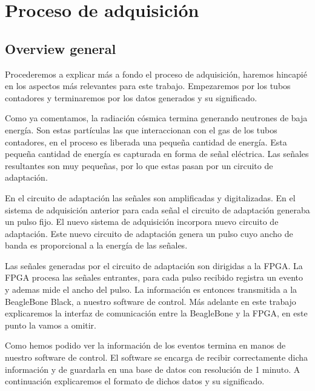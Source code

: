 \section{Proceso de adquisición}
	\subsection{Overview general}
		Procederemos a explicar más a fondo el proceso de adquisición, haremos hincapié en los aspectos más relevantes para este trabajo. Empezaremos
		por los tubos contadores y terminaremos por los datos generados y su significado.
		\par
		Como ya comentamos, la radiación cósmica termina generando neutrones de baja energía. Son estas partículas las que interaccionan con el gas de
		los tubos contadores, en el proceso es liberada una pequeña cantidad de energía.  Esta pequeña cantidad de energía es capturada en forma de
		señal eléctrica. Las señales resultantes son muy pequeñas, por lo que estas pasan por un circuito de adaptación. 
		\par
		En el circuito de adaptación las señales son amplificadas y digitalizadas. En el sistema de adquisición anterior para cada señal el circuito
		de adaptación generaba un pulso fijo. El nuevo sistema de adquisición incorpora nuevo circuito de adaptación. Este nuevo circuito de
		adaptación genera un pulso cuyo ancho de banda es proporcional a la energía de las señales. 
		\par
		Las señales generadas por el circuito de adaptación son dirigidas a la FPGA. La FPGA procesa las señales entrantes, para cada pulso recibido
		registra un evento y ademas mide el ancho del pulso. La información es entonces transmitida a la BeagleBone Black, a nuestro software de
		control. Más adelante en este trabajo explicaremos la interfaz de comunicación entre la BeagleBone y la FPGA, en este punto la vamos a omitir. 
		\par
		Como hemos podido ver la información de los eventos termina en manos de nuestro software de control. El software se encarga de recibir
		correctamente dicha información y de guardarla en una base de datos con resolución de 1 minuto. A continuación explicaremos el formato de
		dichos datos y su significado. 
